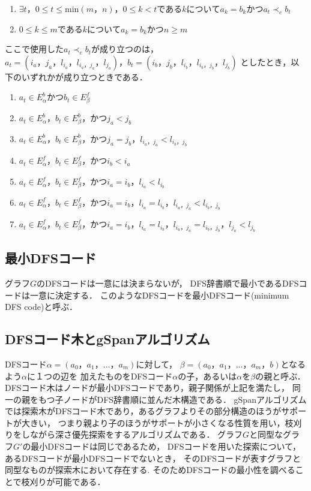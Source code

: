 \documentclass[12pt,fleqn]{jsotsuron}
\begin{document}
\begin{enumerate}
\renewcommand{\labelenumi}{(\roman{enumi})}
  \item $\exists t，0\leq t\leq \mathrm{min}(m，n)，0\leq k<tであるkについてa_k=b_kかつa_t\prec_eb_t$
  \item $0\leq k\leq mであるkについてa_k=b_kかつn\geq m$
\end{enumerate}

ここで使用した$a_t\prec_eb_t$が成り立つのは，
$a_t=(i_a，j_a，l_{i_a}，l_{i_a，j_a}，l_{j_a})，b_t=(i_b，j_b，l_{i_b}，l_{i_b，j_b}，l_{j_b})$
としたとき，以下のいずれかが成り立つときである．
\begin{enumerate}
\renewcommand{\labelenumi}{(\roman{enumi})}
  \item $a_t\in E_\alpha^bかつb_t\in E_\beta^f$
  \item $a_t\in E_\alpha^b，b_t\in E_\beta^b，かつj_a<j_b$
  \item $a_t\in E_\alpha^b，b_t\in E_\beta^b，かつj_a=j_b，l_{i_a，j_a}<l_{i_b，j_b}$
  \item $a_t\in E_\alpha^f，b_t\in E_\beta^f，かつi_b<i_a$
  \item $a_t\in E_\alpha^f，b_t\in E_\beta^f，かつi_a=i_b，l_{i_a}<l_{i_b}$
  \item $a_t\in E_\alpha^f，b_t\in E_\beta^f，かつi_a=i_b，l_{i_a}=l_{i_b}，l_{i_a，j_a}<l_{i_b，j_b}$
  \item $a_t\in E_\alpha^f，b_t\in E_\beta^f，かつi_a=i_b，l_{i_a}=l_{i_b}，l_{i_a，j_a}=l_{i_b，j_b}，l_{j_a}<l_{j_b}$
\end{enumerate}
\subsection{最小DFSコード}
グラフ$G$のDFSコードは一意には決まらないが，
DFS辞書順で最小であるDFSコードは一意に決定する．
このようなDFSコードを最小DFSコード(minimum DFS code)と呼ぶ．
\subsection{DFSコード木とgSpanアルゴリズム}
DFSコード$\alpha = (a_0，a_1，\dots ，a_m)$に対して，
$\beta = (a_0，a_1，\dots ，a_m，b)$となるよう$\alpha$に１つの辺を
加えたものをDFSコード$\alpha$の子，あるいは$\alpha$を$\beta$の親と呼ぶ．
DFSコード木はノードが最小DFSコードであり，親子関係が上記を満たし，
同一の親をもつ子ノードがDFS辞書順に並んだ木構造である．
gSpanアルゴリズムでは探索木がDFSコード木であり，あるグラフよりその部分構造のほうがサポートが大きい，
つまり親より子のほうがサポートが小さくなる性質を用い，枝刈りをしながら深さ優先探索をするアルゴリズムである．
グラフ$G$と同型なグラフ$G'$の最小DFSコードは同じである\cite{gSpan}ため，
DFSコードを用いた探索について，あるDFSコードが最小DFSコードでないとき，
そのDFSコードが表すグラフと同型なものが探索木において存在する.
そのためDFSコードの最小性を調べることで枝刈りが可能である．
\end{document}
